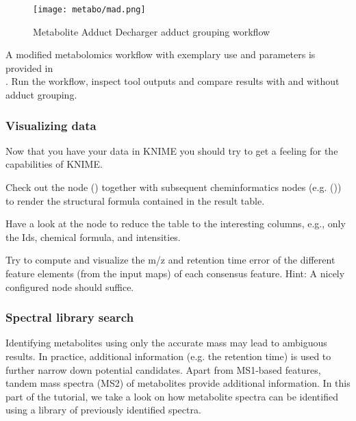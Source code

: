 \begin{figure}[htbp]
  \centering
  \texttt{[image: metabo/mad.png]}
  \caption{Metabolite Adduct Decharger adduct grouping workflow}
  \label{fig:mad}
\end{figure}

\begin{task}
A modified metabolomics workflow with exemplary  use and parameters is provided in\\ . Run the workflow, inspect tool outputs and compare  results with and without adduct grouping.
\end{task}

\subsubsection{Visualizing data}

Now that you have your data in KNIME you should try to get a feeling for the capabilities of KNIME.

\begin{task}
Check out the   node () together with subsequent cheminformatics nodes (e.g.  ()) to render the structural formula contained in the result table.

\end{task}
\begin{task}
Have a look at the  node to reduce the table to the interesting columns, e.g., only the Ids, chemical formula, and intensities.
\end{task}
\begin{task}
Try to compute and visualize the m/z and retention time error of the different feature elements (from the input maps) of each consensus feature. Hint: A nicely configured  node should suffice.
\end{task}

\subsubsection{Spectral library search}

Identifying metabolites using only the accurate mass may lead to ambiguous results. In practice, additional information (e.g. the retention time) is used to further narrow down potential candidates. Apart from MS1-based features, tandem mass spectra (MS2) of metabolites provide additional information.
In this part of the tutorial, we take a look on how metabolite spectra can be identified using a library of previously identified spectra.


